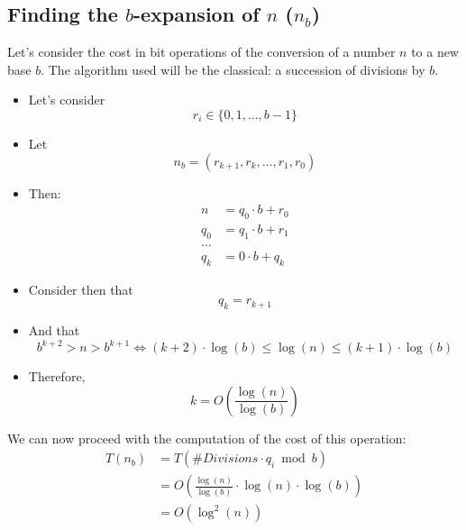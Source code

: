 \subsection{Finding the $b$-expansion of $n$ ($n_{b}$)}
Let's consider the cost in bit operations of the conversion of a number $n$ to a new base $b$. \newline
The algorithm used will be the classical: a succession of divisions by $b$. \newline
\begin{itemize}
    \item Let's consider \[r_{i} \in \{0, 1, \dots, b-1\}\]
    \item Let \[n_{b} = (r_{k+1}, r_{k}, \dots, r_{1}, r_{0})\]
    \item Then: \begin{align*}
                    n &= q_{0} \cdot b + r_{0} \\
                    q_{0} &= q_{1} \cdot b + r_{1} \\
                    \dots \\
                    q_{k} &= 0 \cdot b + q_{k}
                \end{align*}
    \item Consider then that \[q_{k} = r_{k+1}\]
    \item And that \[b^{k+2} > n > b^{k+1} \iff (k+2) \cdot \operatorname{log}(b) \leq \operatorname{log}(n) \leq (k+1) \cdot \operatorname{log}(b)\]
    \item Therefore, \[k = O(\frac{\operatorname{log}(n)}{\operatorname{log}(b)})\]
\end{itemize}
We can now proceed with the computation of the cost of this operation:
\begin{align*}
    T(n_{b}) &= T(\#Divisions \cdot q_{i} \bmod b)\\
    & = O(\frac{\operatorname{log}(n)}{\operatorname{log}(b)} \cdot \operatorname{log}(n) \cdot \operatorname{log}(b)) \\
    &= O(\operatorname{log}^{2}(n))
\end{align*}


